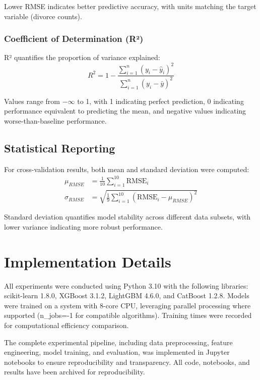Lower RMSE indicates better predictive accuracy, with units matching the target variable (divorce counts).

\subsubsection{Coefficient of Determination (R²)}
R² quantifies the proportion of variance explained:
\begin{equation}
    R^2 = 1 - \frac{\sum_{i=1}^{n}(y_i - \hat{y}_i)^2}{\sum_{i=1}^{n}(y_i - \bar{y})^2}
\end{equation}

Values range from $-\infty$ to 1, with 1 indicating perfect prediction, 0 indicating performance equivalent to predicting the mean, and negative values indicating worse-than-baseline performance.

\subsection{Statistical Reporting}

For cross-validation results, both mean and standard deviation were computed:
\begin{align}
    \mu_{RMSE} &= \frac{1}{10}\sum_{i=1}^{10}\text{RMSE}_i \\
    \sigma_{RMSE} &= \sqrt{\frac{1}{9}\sum_{i=1}^{10}(\text{RMSE}_i - \mu_{RMSE})^2}
\end{align}

Standard deviation quantifies model stability across different data subsets, with lower variance indicating more robust performance.

\section{Implementation Details}

All experiments were conducted using Python 3.10 with the following libraries: scikit-learn 1.8.0, XGBoost 3.1.2, LightGBM 4.6.0, and CatBoost 1.2.8. Models were trained on a system with 8-core CPU, leveraging parallel processing where supported (n\_jobs=-1 for compatible algorithms). Training times were recorded for computational efficiency comparison.

The complete experimental pipeline, including data preprocessing, feature engineering, model training, and evaluation, was implemented in Jupyter notebooks to ensure reproducibility and transparency. All code, notebooks, and results have been archived for reproducibility.
